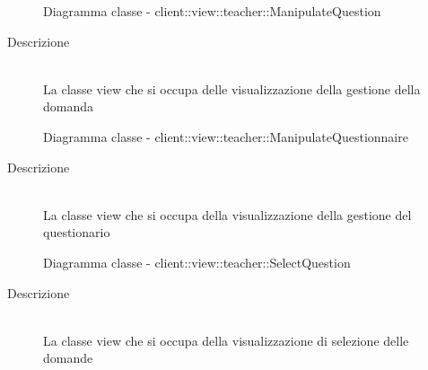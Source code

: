 \begin{figure}[H]
	\centering
	\caption{Diagramma classe - client::view::teacher::ManipulateQuestion}
\end{figure}\begin{description}
\item[Descrizione] \hfill \\
La classe view che si occupa delle visualizzazione della gestione della domanda
\end{description}

\vspace{0.5cm}
\hypertarget{client::view::teacher::ManipulateQuestionnaire}{}
\begin{figure}[H]
	\centering
	\caption{Diagramma classe - client::view::teacher::ManipulateQuestionnaire}
\end{figure}\begin{description}
\item[Descrizione] \hfill \\
La classe view che si occupa della visualizzazione della gestione del questionario 
\end{description}

\vspace{0.5cm}
\hypertarget{client::view::teacher::SelectQuestion}{}
\begin{figure}[H]
	\centering
	\caption{Diagramma classe - client::view::teacher::SelectQuestion}
\end{figure}\begin{description}
\item[Descrizione] \hfill \\
La classe view che si occupa della visualizzazione di selezione delle domande
\end{description}

